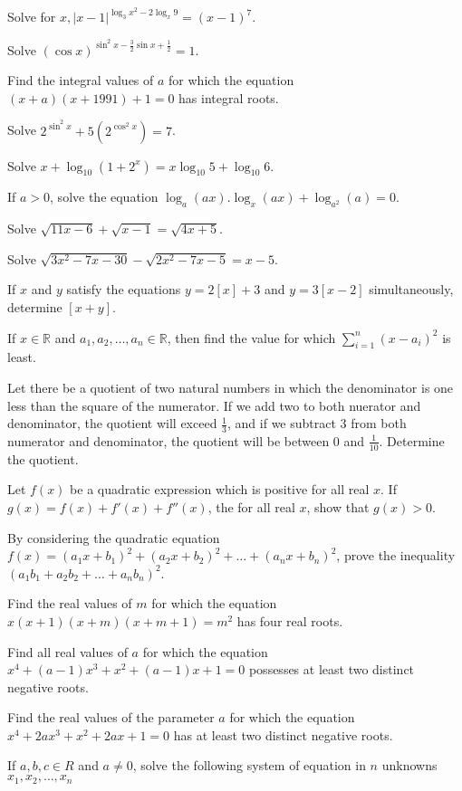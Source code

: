\item Solve for $x, |x - 1|^{\log_3x^2 - 2\log_x9} = (x - 1)^7$.
\item Solve $(\cos x)^{\sin^2x - \tfrac{3}{2}\sin x + \tfrac{1}{2}} = 1$.
\item Find the integral values of $a$ for which the equation $(x + a)(x + 1991) + 1 = 0$ has integral roots.
\item Solve $2^{\sin^2x} + 5(2^{\cos^2x}) = 7$.
\item Solve $x + \log_{10}(1 + 2^x) = x\log_{10}5 + \log_{10}6$.
\item If $a > 0$, solve the equation $\log_a(ax).\log_x(ax) + \log_{a^2}(a) = 0$.
\item Solve $\sqrt{11x - 6} + \sqrt{x - 1} = \sqrt{4x + 5}$.
\item Solve $\sqrt{3x^2 - 7x - 30} - \sqrt{2x^2 - 7x - 5} = x - 5$.
\item If $x$ and $y$ satisfy the equations $y = 2[x] + 3$ and $y = 3[x - 2]$ simultaneously, determine $[x + y]$.
\item If $x\in\mathbb{R}$ and $a_1, a_2, \ldots, a_n\in\mathbb{R}$, then find the value for which $\displaystyle\sum_{i = 1}^n(x -
  a_i)^2$ is least.
\item Let there be a quotient of two natural numbers in which the denominator is one less than the square of the numerator. If we
  add two to both nuerator and denominator, the quotient will exceed $\frac{1}{3}$, and if we subtract $3$ from both numerator and
  denominator, the quotient will be between $0$ and $\frac{1}{10}$. Determine the quotient.
\item Let $f(x)$ be a quadratic expression which is positive for all real $x$. If $g(x) = f(x) + f'(x) + f''(x)$, the for all real
  $x$, show that $g(x) > 0$.
\item By considering the quadratic equation $f(x) = (a_1x + b_1)^2 + (a_2x + b_2)^2 + \ldots + (a_nx + b_n)^2$, prove the
  inequality $(a_1b_1 + a_2b_2 + \ldots + a_nb_n)^2$.
\item Find the real values of $m$ for which the equation $x(x + 1)(x + m)(x + m + 1) = m^2$ has four real roots.
\item Find all real values of $a$ for which the equation $x^4 + (a - 1)x^3 + x^2 + (a - 1)x + 1 = 0$ possesses at least two
  distinct negative roots.
\item Find the real values of the parameter $a$ for which the equation $x^4 + 2ax^3 + x^2 + 2ax + 1 = 0$ has at least two distinct
  negative roots.
\item If $a, b, c \in R$ and $a\neq 0$, solve the following system of equation in $n$ unknowns $x_1, x_2, \ldots, x_n$
